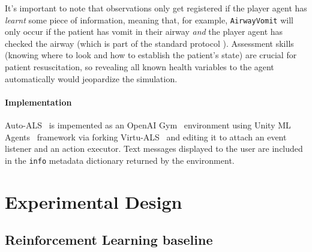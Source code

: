 It's important to note that observations only get registered if the player agent has \emph{learnt} some piece of information, meaning that, for example, \verb|AirwayVomit| will only occur if the patient has vomit in their airway \emph{and} the player agent has checked the airway (which is part of the standard protocol \cite{thimInitialAssessmentTreatment2012}).
Assessment skills (knowing where to look and how to establish the patient's state) are crucial for patient resuscitation, so revealing all known health variables to the agent automatically would jeopardize the simulation.

\paragraph{Implementation}

Auto-ALS~\cite{liventsevVadim0x60Autoals2024} is impemented as an OpenAI Gym~\cite{brockmanOpenaiGym2016} environment using Unity ML Agents~\cite{almon-manzanoDeepReinforcementLearning2022,julianiUnityGeneralPlatform2020,lanhamLearnUnityMLAgentsfundamentals2018,nandyUnityMLAgents2018} framework via forking Virtu-ALS~\cite{liventsevVadim0x60Virtualsplus2024} and editing it to attach an event listener and an action executor.
Text messages displayed to the user are included in the \texttt{info} metadata dictionary returned by the environment.

\newpage
\section{Experimental Design}
\label{sec:auto-als-exp}

\subsection{Reinforcement Learning baseline}

